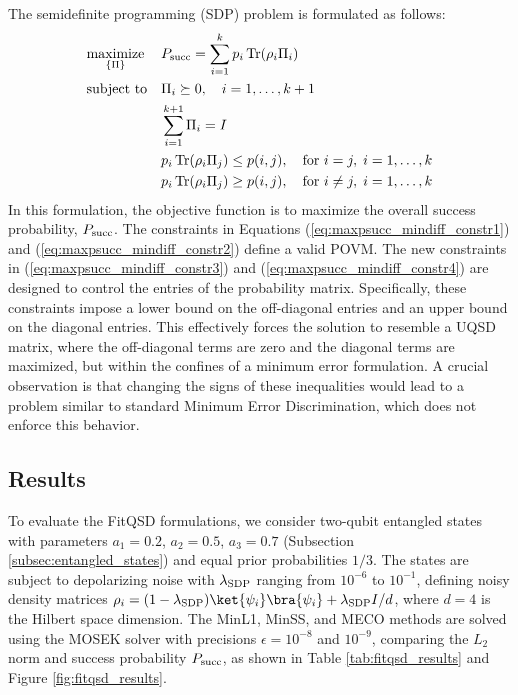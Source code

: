 The semidefinite programming (SDP) problem is formulated as follows:
\begin{align}
    \label{eq:maxpsucc_mindiff_obj}
     & \underset{\{\Pi\}}{\text{maximize}} &  & P_{\mathrm{succ}} = \sum_{i=1}^{k} p_{i} \operatorname{Tr}(\rho_{i} \Pi_{i})                                   \\
    \label{eq:maxpsucc_mindiff_constr1}
     & \text{subject to}                   &  & \Pi_{i} \succeq 0, \quad i = 1, \ldots, k+1                                                         \\
    \label{eq:maxpsucc_mindiff_constr2}
     &                                     &  & \sum_{i=1}^{k+1} \Pi_i = I                                                                          \\
    \label{eq:maxpsucc_mindiff_constr3}
     &                                     &  & p_{i} \operatorname{Tr}(\rho_{i} \Pi_{j}) \leq p(i, j), \quad \text{for } i = j, \; i=1,\ldots,k    \\
    \label{eq:maxpsucc_mindiff_constr4}
     &                                     &  & p_{i} \operatorname{Tr}(\rho_{i} \Pi_{j}) \geq p(i, j), \quad \text{for } i \neq j, \; i=1,\ldots,k
\end{align}
In this formulation, the objective function is to maximize the overall success probability, $P_{\mathrm{succ}}$.
The constraints in Equations (\ref{eq:maxpsucc_mindiff_constr1}) and (\ref{eq:maxpsucc_mindiff_constr2}) define a valid POVM.
The new constraints in (\ref{eq:maxpsucc_mindiff_constr3}) and (\ref{eq:maxpsucc_mindiff_constr4})
are designed to control the entries of the probability matrix.
Specifically, these constraints impose a lower bound on the off-diagonal
entries and an upper bound on the diagonal entries.
This effectively forces the solution to resemble a UQSD matrix, where the
off-diagonal terms are zero and the diagonal terms are maximized, but within
the confines of a minimum error formulation.
A crucial observation is that changing the signs of these inequalities would
lead to a problem similar to standard Minimum Error Discrimination, which does
not enforce this behavior.

\subsection{Results}
To evaluate the FitQSD formulations, we consider two-qubit entangled states with parameters $a_1 = 0.2$, $a_2 = 0.5$, $a_3 = 0.7$ (Subsection \ref{subsec:entangled_states}) and equal prior probabilities $1/3$.
The states are subject to depolarizing noise with $\lambda_{\mathrm{SDP}}$ ranging from $10^{-6}$ to $10^{-1}$, defining noisy density matrices $\rho_i = (1-\lSDP)\ket{\psi_i}\bra{\psi_i} + \lSDP I/d$, where $d = 4$ is the Hilbert space dimension.
The MinL1, MinSS, and MECO methods are solved using the MOSEK solver with precisions $\epsilon = 10^{-8}$ and $10^{-9}$, comparing the $L_2$ norm and success probability $P_{\mathrm{succ}}$, as shown in Table \ref{tab:fitqsd_results} and Figure \ref{fig:fitqsd_results}.

